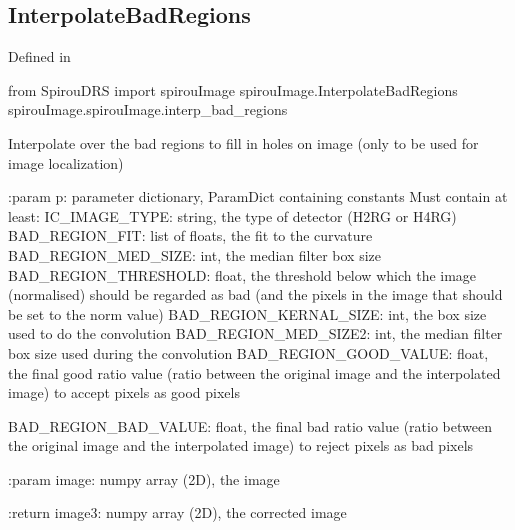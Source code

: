 \noindent\begin{minipage}{\textwidth}
\subsection{InterpolateBadRegions}

Defined in \spirouImage{}

\begin{pythonbox}
from SpirouDRS import spirouImage
spirouImage.InterpolateBadRegions
spirouImage.spirouImage.interp_bad_regions
\end{pythonbox}

\begin{pythondocstring}
Interpolate over the bad regions to fill in holes on image (only to be used
for image localization)

:param p: parameter dictionary, ParamDict containing constants
        Must contain at least:
            IC_IMAGE_TYPE: string, the type of detector (H2RG or H4RG)
            BAD_REGION_FIT: list of floats, the fit to the curvature
            BAD_REGION_MED_SIZE: int, the median filter box size
            BAD_REGION_THRESHOLD: float, the threshold below which the
                                  image (normalised) should be regarded as
                                  bad (and the pixels in the image that
                                  should be set to the norm value)
            BAD_REGION_KERNAL_SIZE: int, the box size used to do the
                                    convolution
            BAD_REGION_MED_SIZE2: int, the median filter box size used
                                  during the convolution
            BAD_REGION_GOOD_VALUE: float, the final good ratio value
                                   (ratio between the original image and
                                    the interpolated image) to accept
                                    pixels as good pixels

            BAD_REGION_BAD_VALUE: float, the final bad ratio value
                                   (ratio between the original image and
                                    the interpolated image) to reject
                                    pixels as bad pixels

:param image: numpy array (2D), the image

:return image3: numpy array (2D), the corrected image
\end{pythondocstring}
\end{minipage}

